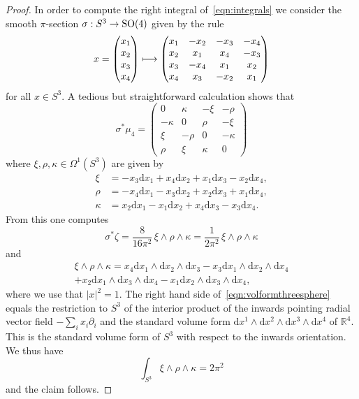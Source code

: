 \documentclass[AHL,Unicode,longabstracts]{cedram}
\DeclareMathOperator{\SO}{SO}
\renewcommand*{\d}{\mathrm{d}}
\newcommand*{\R}{\mathbb{R}}
\renewcommand*{\to}{\mathchoice{\longrightarrow}{\rightarrow}{\rightarrow}{\rightarrow}}
\let\oldmapsto\mapsto
\renewcommand*{\mapsto}{\mathchoice{\longmapsto}{\oldmapsto}{\oldmapsto}{\oldmapsto}}
\newcommand*{\R}{\mathbb{R}}
\begin{document}
\begin{proof}
In order to compute the right integral of~\eqref{eqn:integrals} we consider the smooth $\pi$-section $\sigma : S^3 \to \SO(4)$ given by the rule
\[
x=
\begin{pmatrix}
x_1 \\
x_2 \\
x_3 \\
x_4
\end{pmatrix}
\mapsto
\begin{pmatrix} 
x_1 & -x_2 & -x_3 & -x_4 \\
x_2 & x_1 & x_4 & -x_3 \\
x_3 & -x_4 & x_1 & x_2 \\
x_4 & x_3 & -x_2 & x_1
\end{pmatrix}
\]
for all $x \in S^3$. A tedious but straightforward calculation shows that
\[
\sigma^*\mu_4=
\begin{pmatrix}
0 & \kappa & -\xi & -\rho \\
-\kappa & 0 & \rho & -\xi \\
\xi & -\rho & 0 & -\kappa \\
\rho & \xi & \kappa & 0
\end{pmatrix}
\]
where $\xi,\rho,\kappa \in \Omega^1(S^3)$ are given by
\begin{equation}\label{eqn:leftinvariantforms}
\begin{aligned}
\xi&=-x_3\d x_1+x_4\d x_2+x_1\d x_3-x_2 \d x_4,\\
\rho&=-x_4\d x_1-x_3\d x_2+x_2\d x_3+x_1\d x_4,\\
\kappa&=x_2\d x_1-x_1\d x_2+x_4\d x_3-x_3 \d x_4.
\end{aligned}
\end{equation}
From this one computes
\[
\sigma^*\zeta=\frac{8}{16\pi^2}\,\xi\wedge\rho\wedge\kappa=\frac{1}{2\pi^2}\,\xi\wedge\rho\wedge\kappa
\]
and
\begin{multline}\label{eqn:volformthreesphere}
\xi\wedge\rho\wedge \kappa=x_4\d x_1\wedge \d x_2 \wedge \d x_3-x_3\d x_1\wedge\d x_2\wedge \d x_4\\
+x_2\d x_1\wedge \d x_3\wedge \d x_4-x_1\d x_2\wedge \d x_3 \wedge\d x_4,
\end{multline}
where we use that $|x|^2=1$. The right hand side of~\eqref{eqn:volformthreesphere} equals the restriction to $S^3$ of the interior product of the inwards pointing radial vector field $-\sum_{i}x_i\partial_i$ and the standard volume form $\d x^1\wedge\d x^2\wedge \d x^3\wedge \d x^4$ of $\R^4$. This is the standard volume form of $S^3$ with respect to the inwards orientation. We thus have
\begin{equation}\label{eqn:volumethresphere}
\int_{S^3}\xi\wedge \rho\wedge \kappa=2\pi^2
\end{equation}
and the claim follows.
\end{proof}
\end{document}
